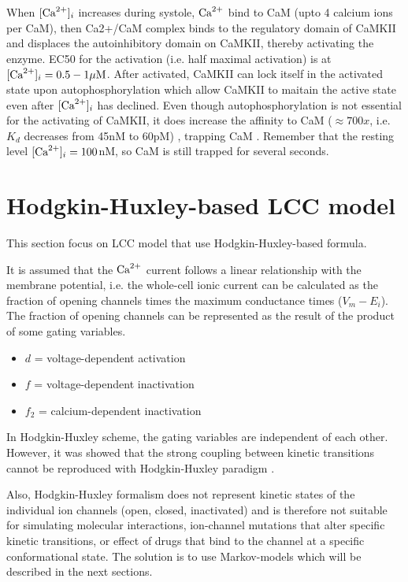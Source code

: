 When $[{\text{Ca}^{2+}}]_i$ increases during systole, ${\text{Ca}^{2+}}$ bind to CaM (upto 4 calcium ions
per CaM), then Ca2+/CaM complex binds to the regulatory domain of CaMKII and
displaces the autoinhibitory domain on CaMKII, thereby activating the enzyme.
EC50 for the activation (i.e. half maximal activation) is at
$[{\text{Ca}^{2+}}]_i=0.5-1{\mu\text{M}}$. After activated, CaMKII can lock itself in the activated
state upon autophosphorylation which allow CaMKII to maitain the active state
even after $[{\text{Ca}^{2+}}]_i$ has declined. Even though autophosphorylation is not
essential for the activating of CaMKII, it does increase the affinity to CaM
($\approx 700x$, i.e. $K_d$  decreases from 45nM to 60pM) \citep{braun2005},
trapping CaM \citep{meyer2006}. Remember that the resting level
$[{\text{Ca}^{2+}}]_i=100$nM, so CaM is still trapped for several seconds.

\section{Hodgkin-Huxley-based LCC model}

This section focus on LCC model that use Hodgkin-Huxley-based formula.

It is assumed that the ${\text{Ca}^{2+}}$ current follows a linear relationship with the
membrane potential, i.e. the whole-cell ionic current can be calculated as the
fraction of opening channels times the maximum conductance times ($V_m-E_i$). 
The fraction of opening channels can be represented as the result of the product
of some gating variables.
\begin{itemize}
  \item $d$ = voltage-dependent activation
  \item $f$ = voltage-dependent inactivation
  \item $f_2$ = calcium-dependent inactivation
\end{itemize}

In Hodgkin-Huxley scheme, the gating variables are independent of each other.
However, it was showed that the strong coupling between kinetic transitions
cannot be reproduced with Hodgkin-Huxley paradigm \citep{rudy2006}.

Also, Hodgkin-Huxley formalism does not represent kinetic states of the
individual ion channels (open, closed, inactivated) and is therefore not
suitable for simulating molecular interactions, ion-channel mutations that alter
specific kinetic transitions, or effect of drugs that bind to the channel at a
specific conformational state. The solution is to use Markov-models which will
be described in the next sections.

